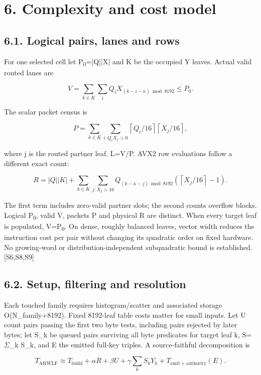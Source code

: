 \documentclass[10pt,letterpaper]{article}
\begin{document}
\section*{6. Complexity and cost model}

\subsection*{6.1. Logical pairs, lanes and rows}

For one selected cell let P\textsubscript{0}=|Q||X| and K be the occupied Y leaves. Actual valid routed lanes are


\[
V=\sum_{k\in K}\sum_i Q_iX_{(k-i-\kappa)\bmod8192}\leq P_0.
\]

The scalar packet census is


\[
P=\sum_{k\in K}\sum_{i:Q_iX_j>0}\left\lceil Q_i/16\right\rceil\left\lceil X_j/16\right\rceil,
\]

where j is the routed partner leaf. L=V/P. AVX2 row evaluations follow a different exact count:


\[
R=|Q||K|+\sum_{k\in K}\sum_{j:X_j>16}Q_{(k-\kappa-j)\bmod8192}\left(\left\lceil X_j/16\right\rceil-1\right).
\]

The first term includes zero-valid partner slots; the second counts overflow blocks. Logical P\textsubscript{0}, valid V, packets P and physical R are distinct. When every target leaf is populated, V=P\textsubscript{0}. On dense, roughly balanced leaves, vector width reduces the instruction cost per pair without changing its quadratic order on fixed hardware. No growing-word or distribution-independent subquadratic bound is established. [S6,S8,S9]


\subsection*{6.2. Setup, filtering and resolution}

Each touched family requires histogram/scatter and associated storage O(N\_family+8192). Fixed 8192-leaf table costs matter for small inputs. Let U count pairs passing the first two byte tests, including pairs rejected by later bytes; let S\_k be queued pairs surviving all byte predicates for target leaf k, S=\ensuremath{\Sigma}\_k S\_k, and E the emitted full-key triples. A source-faithful decomposition is


\[
T_{\mathrm{ARWLF}}\approx T_{\mathrm{build}}+\alpha R+\beta U+\gamma\sum_kS_kY_k+T_{\mathrm{emit+authority}}(E).
\]
\end{document}
